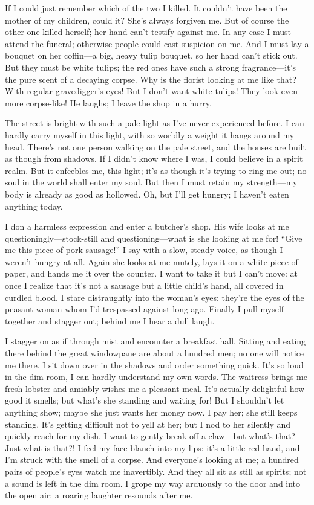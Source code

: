 \documentclass[12pt,a4paper]{article}
\begin{document}
If I could just remember which of the two I killed. It couldn’t have been the mother of my children, could it? She’s always forgiven me. But of course the other one killed herself; her hand can’t testify against me. In any case I must attend the funeral; otherwise people could cast suspicion on me. And I must lay a bouquet on her coffin—a big, heavy tulip bouquet, so her hand can’t stick out. But they must be white tulips; the red ones have such a strong fragrance—it’s the pure scent of a decaying corpse. Why is the florist looking at me like that? With regular gravedigger’s eyes! But I don’t want white tulips! They look even more corpse-like! He laughs; I leave the shop in a hurry.

The street is bright with such a pale light as I’ve never experienced before. I can hardly carry myself in this light, with so worldly a weight it hangs around my head. There’s not one person walking on the pale street, and the houses are built as though from shadows. If I didn’t know where I was, I could believe in a spirit realm. But it enfeebles me, this light; it’s as though it’s trying to ring me out; no soul in the world shall enter my soul. But then I must retain my strength—my body is already as good as hollowed. Oh, but I’ll get hungry; I haven’t eaten anything today.

I don a harmless expression and enter a butcher’s shop. His wife looks at me questioningly—stock-still and questioning—what is she looking at me for! “Give me this piece of pork sausage!” I say with a slow, steady voice, as though I weren’t hungry at all. Again she looks at me mutely, lays it on a white piece of paper, and hands me it over the counter. I want to take it but I can’t move: at once I realize that it’s not a sausage but a little child’s hand, all covered in curdled blood. I stare distraughtly into the woman’s eyes: they’re the eyes of the peasant woman whom I’d trespassed against long ago. Finally I pull myself together and stagger out; behind me I hear a dull laugh.

I stagger on as if through mist and encounter a breakfast hall. Sitting and eating there behind the great windowpane are about a hundred men; no one will notice me there. I sit down over in the shadows and order something quick. It’s so loud in the dim room, I can hardly understand my own words. The waitress brings me fresh lobster and amiably wishes me a pleasant meal. It’s actually delightful how good it smells; but what’s she standing and waiting for! But I shouldn’t let anything show; maybe she just wants her money now. I pay her; she still keeps standing. It’s getting difficult not to yell at her; but I nod to her silently and quickly reach for my dish. I want to gently break off a claw—but what’s that? Just what is that?! I feel my face blanch into my lips: it’s a little red hand, and I’m struck with the smell of a corpse. And everyone’s looking at me; a hundred pairs of people’s eyes watch me inavertibly. And they all sit as still as spirits; not a sound is left in the dim room. I grope my way arduously to the door and into the open air; a roaring laughter resounds after me.
\end{document}
